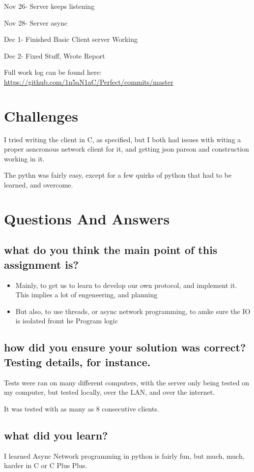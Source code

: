 \documentclass[letterpaper,10pt,titlepage]{article}
\begin{document}
Nov 26- Server keeps listening

Nov 28- Server async

Dec 1- Finished Basic Client server Working

Dec 2- Fixed Stuff, Wrote Report

Full work log can be found here:
\url{https://github.com/1n5aN1aC/Perfect/commits/master}

\section{Challenges}

I tried writing the client in C, as specified, but I both had issues with witing a proper asncronous network client for it, and getting json parson and construction working in it.

The pythn was fairly easy, except for a few quirks of python that had to be learned, and overcome.

\section{Questions And Answers}

\subsection{what do you think the main point of this assignment is?}

\begin{itemize}
\item Mainly, to get us to learn to develop our own protocol, and implement it.  This implies a lot of engeneering, and planning
\item But also, to use threads, or async network programming, to amke sure the IO is isolated fromt he Program logic
\end{itemize}

\subsection{how did you ensure your solution was correct? Testing details, for instance.}

Tests were ran on many different computers, with the server only being tested on my computer, but tested locally, over the LAN, and over the internet.

It was tested with as many as 8 consecutive clients.

\subsection{what did you learn?}

I learned Async Network programming in python is fairly fun, but much, much, harder in C or C Plus Plus.
\end{document}
